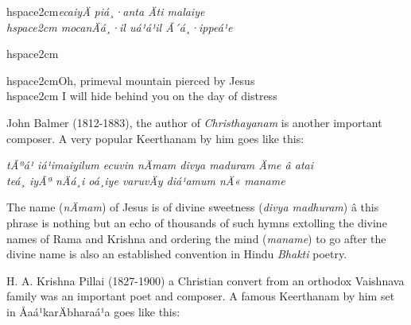 \begin{myquote}
hspace{2cm}\textit{ecaiyÄ piá¸·anta Äti malaiye\\hspace{2cm} mocanÄá¸·il uá¹á¹il Ã´á¸·ippeá¹e }
\end{myquote}

\begin{myquote}
hspace{2cm}
\end{myquote}

\begin{myquote}
hspace{2cm}Oh, primeval mountain pierced by Jesus\\hspace{2cm} I will hide behind you on the day of distress
\end{myquote}

John Balmer (1812-1883), the author of \textit{Christhayanam} is another important composer. A very popular Keerthanam by him goes like this:

\begin{myquote}
\textit{tÃªá¹ iá¹imaiyilum ecuvin nÄmam divya maduram Äme â atai\\ teá¸ iyÃª nÄá¸i oá¸iye varuvÄy diá¹amum nÄ« maname}
\end{myquote}

\begin{myquote}
\end{myquote}

The name (\textit{nÄmam}) of Jesus is of divine sweetness (\textit{divya madhuram}) â this phrase is nothing but an echo of thousands of such hymns extolling the divine names of Rama and Krishna and ordering the mind (\textit{maname}) to go after the divine name is also an established convention in Hindu \textit{Bhakti} poetry.

\newpage

H. A. Krishna Pillai (1827-1900) a Christian convert from an orthodox Vaishnava family was an important poet and composer. A famous Keerthanam by him set in Åaá¹karÄbharaá¹a goes like this:

